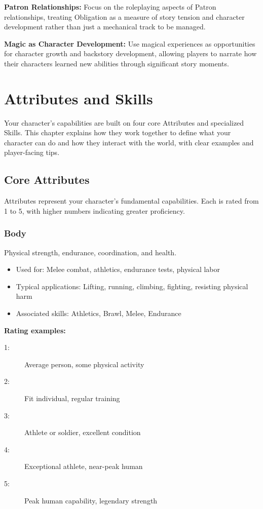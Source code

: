 \documentclass[11pt,twoside,openany]{book}
\begin{document}
\textbf{Patron Relationships:} Focus on the roleplaying aspects of Patron relationships, treating Obligation as a measure of story tension and character development rather than just a mechanical track to be managed.

\textbf{Magic as Character Development:} Use magical experiences as opportunities for character growth and backstory development, allowing players to narrate how their characters learned new abilities through significant story moments.

\chapter{Attributes and Skills} \label{ch:attributes}

Your character's capabilities are built on four core Attributes and specialized Skills. This chapter explains how they work together to define what your character can do and how they interact with the world, with clear examples and player-facing tips.

\section*{Core Attributes} 

Attributes represent your character's fundamental capabilities. Each is rated from 1 to 5, with higher numbers indicating greater proficiency.

\subsection*{Body}

Physical strength, endurance, coordination, and health.
\begin{itemize}
\item Used for: Melee combat, athletics, endurance tests, physical labor
\item Typical applications: Lifting, running, climbing, fighting, resisting physical harm
\item Associated skills: Athletics, Brawl, Melee, Endurance
\end{itemize}

\textbf{Rating examples:}
\begin{description}
\item[1:] Average person, some physical activity
\item[2:] Fit individual, regular training
\item[3:] Athlete or soldier, excellent condition
\item[4:] Exceptional athlete, near-peak human
\item[5:] Peak human capability, legendary strength
\end{description}
\end{document}
